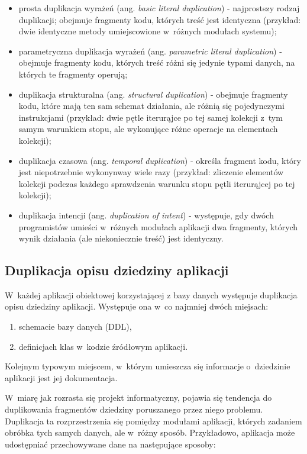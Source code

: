 \begin{itemize}
 \item prosta duplikacja wyrażeń (ang. \emph{basic literal duplication}) - najprostszy rodzaj duplikacji; obejmuje fragmenty kodu, których treść jest identyczna (przykład: dwie identyczne metody umiejscowione w~różnych modułach systemu);
 \item parametryczna duplikacja wyrażeń (ang. \emph{parametric literal duplication}) - obejmuje fragmenty kodu, których treść różni się jedynie typami danych, na których te fragmenty operują;
 \item duplikacja strukturalna (ang. \emph{structural duplication}) - obejmuje fragmenty kodu, które mają ten sam schemat działania, ale różnią się pojedynczymi instrukcjami (przykład: dwie pętle iterurąjce po tej samej kolekcji z~tym samym warunkiem stopu, ale wykonujące różne operacje na elementach kolekcji);
 \item duplikacja czasowa (ang. \emph{temporal duplication}) - określa fragment kodu, który jest niepotrzebnie wykonynway wiele razy (przykład: zliczenie elementów kolekcji podczas każdego sprawdzenia warunku stopu pętli iterurąjcej po tej kolekcji);
 \item duplikacja intencji (ang. \emph{duplication of intent}) - występuje, gdy dwóch programistów umieści w~różnych modułach aplikacji dwa fragmenty, których wynik działania (ale niekoniecznie treść) jest identyczny.
\end{itemize}


\subsection{Duplikacja opisu dziedziny aplikacji}

W~każdej aplikacji obiektowej korzystającej z bazy danych występuje duplikacja opisu dziedziny aplikacji.
Występuje ona w~co najmniej dwóch miejsach:

\begin{enumerate}
 \item schemacie bazy danych (DDL),
 \item definicjach klas w~kodzie źródłowym aplikacji.
\end{enumerate}

Kolejnym typowym miejscem, w~którym umieszcza się informacje o~dziedzinie aplikacji jest jej dokumentacja.

W~miarę jak rozrasta się projekt informatyczny, pojawia się tendencja do duplikowania fragmentów dziedziny poruszanego przez niego problemu.
Duplikacja ta rozprzestrzenia się pomiędzy modułami aplikacji, których zadaniem obróbka tych samych danych, ale w~różny sposób.
Przykładowo, aplikacja może udostępniać przechowywane dane na następujące sposoby:

